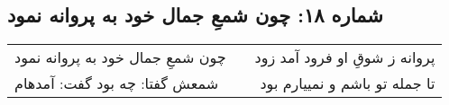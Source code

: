 \begin{center}
\section*{شماره ۱۸: چون شمعِ جمال خود به پروانه نمود}
\label{sec:018}
\begin{longtable}{l p{0.5cm} r}
چون شمعِ جمال خود به پروانه نمود
&&
پروانه ز شوقِ او فرود آمد زود
\\
شمعش گفتا: چه بود گفت: آمدهام
&&
تا جمله تو باشم و نمییارم بود
\\
\end{longtable}
\end{center}
